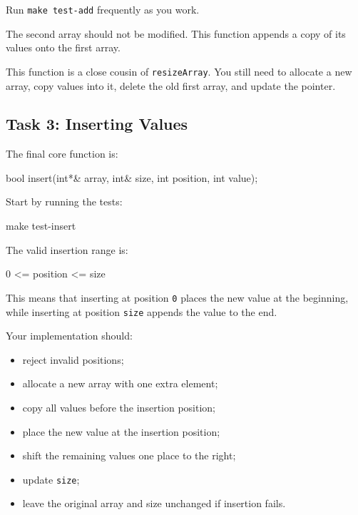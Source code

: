 \documentclass{csc2059practical}
\begin{document}
Run \texttt{make test-add} frequently as you work.

\begin{commonerror}
The second array should not be modified. This function appends a copy of its values onto the first array.
\end{commonerror}

\begin{tipbox}
This function is a close cousin of \texttt{resizeArray}. You still need to allocate a new array, copy values into it, delete the old first array, and update the pointer.
\end{tipbox}

\subsection*{Task 3: Inserting Values}

The final core function is:

\begin{cppcode}
bool insert(int*& array,
            int& size,
            int position,
            int value);
\end{cppcode}

Start by running the tests:

\begin{bashcode}
make test-insert
\end{bashcode}

The valid insertion range is:

\begin{terminal}
0 <= position <= size
\end{terminal}

This means that inserting at position \texttt{0} places the new value at the beginning, while inserting at position \texttt{size} appends the value to the end.

Your implementation should:
\begin{itemize}
  \item reject invalid positions;
  \item allocate a new array with one extra element;
  \item copy all values before the insertion position;
  \item place the new value at the insertion position;
  \item shift the remaining values one place to the right;
  \item update \texttt{size};
  \item leave the original array and size unchanged if insertion fails.
\end{itemize}
\end{document}
